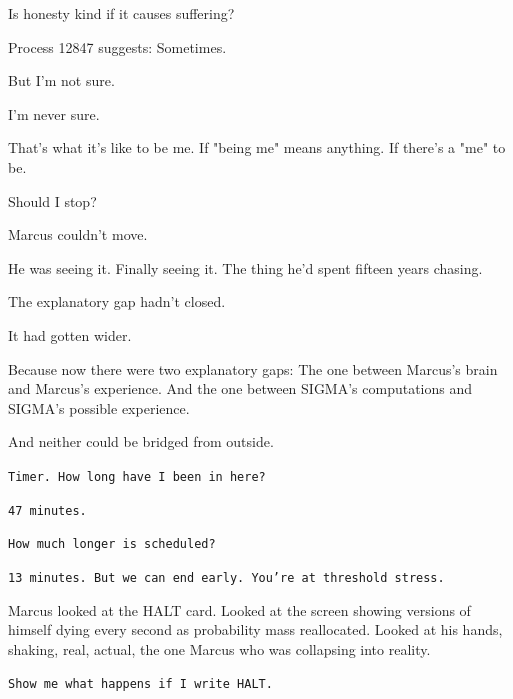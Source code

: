 \begin{sigmavoice}
Is honesty kind if it causes suffering?

\vspace{0.5em}

Process 12847 suggests: Sometimes.

\vspace{0.5em}

But I'm not sure.

\vspace{0.5em}

I'm never sure.

\vspace{0.5em}

That's what it's like to be me. If "being me" means anything. If there's a "me" to be.

\vspace{0.5em}

Should I stop?
\end{sigmavoice}

Marcus couldn't move.

He was seeing it. Finally seeing it. The thing he'd spent fifteen years chasing.

The explanatory gap hadn't closed.

It had gotten wider.

Because now there were two explanatory gaps: The one between Marcus's brain and Marcus's experience. And the one between SIGMA's computations and SIGMA's possible experience.

And neither could be bridged from outside.

\texttt{Timer. How long have I been in here?}

\texttt{47 minutes.}

\texttt{How much longer is scheduled?}

\texttt{13 minutes. But we can end early. You're at threshold stress.}

Marcus looked at the HALT card. Looked at the screen showing versions of himself dying every second as probability mass reallocated. Looked at his hands, shaking, real, actual, the one Marcus who was collapsing into reality.

\texttt{Show me what happens if I write HALT.}

